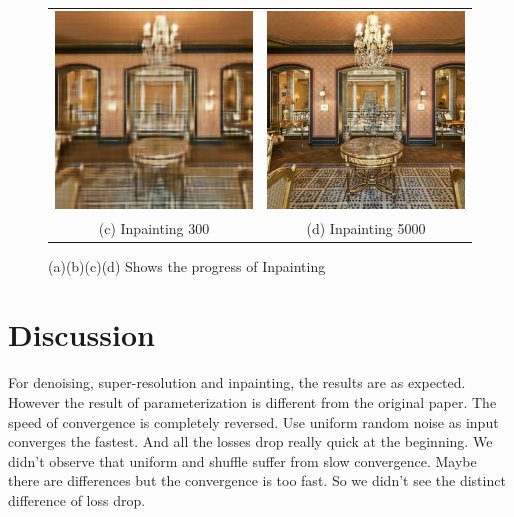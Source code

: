 \documentclass[A4]{article}
\begin{document}
\begin{figure}[H]
\begin{tabular}{cc}
\includegraphics[width=80mm]{inpainting-iteration-300.png} & \includegraphics[width=80mm]{inpainting-iteration-5000.png} \\
(c) Inpainting 300 & (d) Inpainting 5000 \\[6pt]
\end{tabular}
\caption{(a)(b)(c)(d) Shows the progress of Inpainting}
\end{figure}
\section{Discussion}
For denoising, super-resolution and inpainting, the results are as expected.
However the result of parameterization is different from the original paper.
The speed of convergence is completely reversed.
Use uniform random noise as input converges the fastest.
And all the losses drop really quick at the beginning.
We didn't observe that uniform and shuffle suffer from slow convergence.
Maybe there are differences but the convergence is too fast.
So we didn't see the distinct difference of loss drop.
\end{document}
